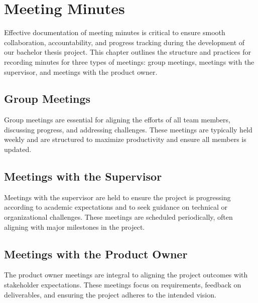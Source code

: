 \chapter{Meeting Minutes}
Effective documentation of meeting minutes is critical to ensure smooth collaboration, accountability, and progress tracking during the development of our bachelor thesis project. This chapter outlines the structure and practices for recording minutes for three types of meetings: group meetings, meetings with the supervisor, and meetings with the product owner.

\section{Group Meetings}
Group meetings are essential for aligning the efforts of all team members, discussing progress, and addressing challenges. These meetings are typically held weekly and are structured to maximize productivity and ensure all members is updated.

\section{Meetings with the Supervisor}
Meetings with the supervisor are held to ensure the project is progressing according to academic expectations and to seek guidance on technical or organizational challenges. These meetings are scheduled periodically, often aligning with major milestones in the project.

\section{Meetings with the Product Owner}
The product owner meetings are integral to aligning the project outcomes with stakeholder expectations. These meetings focus on requirements, feedback on deliverables, and ensuring the project adheres to the intended vision.

